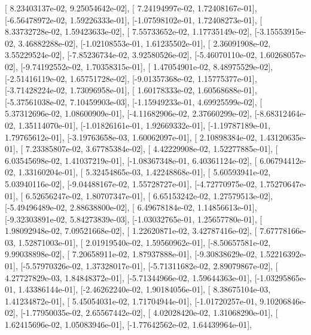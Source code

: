 \documentclass{article}
\begin{document}
       [ 8.23403137e-02,  9.25054642e-02],
       [ 7.24194997e-02,  1.72408167e-01],
       [-6.56478972e-02,  1.59226333e-01],
       [-1.07598102e-01,  1.72408273e-01],
       [ 8.33732728e-02,  1.59423633e-02],
       [ 7.55733652e-02,  1.17735149e-02],
       [-3.15553915e-02,  3.46882288e-02],
       [-1.02108553e-01,  1.61235502e-01],
       [ 2.36091908e-02,  3.55229524e-02],
       [-7.85236734e-02,  3.92580526e-02],
       [-5.46070110e-02,  1.60268057e-02],
       [-9.74192552e-02,  1.70358315e-01],
       [ 1.47054901e-02,  8.48975529e-02],
       [-2.51416119e-02,  1.65751728e-02],
       [-9.01357368e-02,  1.15775377e-01],
       [-3.71428224e-02,  1.73096958e-01],
       [ 1.60178333e-02,  1.60568688e-01],
       [-5.37561038e-02,  7.10459903e-03],
       [-1.15949233e-01,  4.69925599e-02],
       [ 5.37312696e-02,  1.08600909e-01],
       [-4.11682906e-02,  2.37660299e-02],
       [-8.68312464e-02,  1.35114070e-01],
       [-1.01826161e-01,  1.92669332e-01],
       [-1.19787189e-01,  1.79765612e-01],
       [-3.19763658e-03,  1.60062097e-01],
       [ 2.10898384e-02,  1.43120635e-01],
       [ 7.23385807e-02,  3.67785384e-02],
       [ 4.42229908e-02,  1.52277885e-01],
       [ 6.03545698e-02,  1.41037219e-01],
       [-1.08367348e-01,  6.40361124e-02],
       [ 6.06794412e-02,  1.33160204e-01],
       [ 5.32454865e-03,  1.42248868e-01],
       [ 5.60593941e-02,  5.03940116e-02],
       [-9.04488167e-02,  1.55728727e-01],
       [-4.72770975e-02,  1.75270647e-01],
       [ 6.52656247e-02,  1.80707347e-01],
       [ 6.65153242e-02,  1.27579513e-02],
       [-5.49496489e-02,  2.88638800e-02],
       [ 6.49678184e-02,  1.14856613e-01],
       [-9.32303891e-02,  5.84273839e-03],
       [-1.03032765e-01,  1.25657780e-01],
       [ 1.98092948e-02,  7.09521668e-02],
       [ 1.22620871e-02,  3.42787416e-02],
       [ 7.67778166e-03,  1.52871003e-01],
       [ 2.01919540e-02,  1.59560962e-01],
       [-8.50657581e-02,  9.99038898e-02],
       [ 7.20658911e-02,  1.87937888e-01],
       [-9.30838629e-02,  1.52216392e-01],
       [-5.57970326e-02,  1.37328017e-01],
       [-5.71311682e-02,  2.89079867e-02],
       [ 4.27727829e-03,  1.84848372e-01],
       [-5.71344966e-02,  1.59644363e-01],
       [-1.03295865e-01,  1.43386144e-01],
       [-2.46262240e-02,  1.90184056e-01],
       [ 8.38675104e-03,  1.41234872e-01],
       [ 5.45054031e-02,  1.71704944e-01],
       [-1.01720257e-01,  9.10206846e-02],
       [-1.77950035e-02,  2.65567442e-02],
       [ 4.02028420e-02,  1.31068290e-01],
       [ 1.62415696e-02,  1.05083946e-01],
       [-1.77642562e-02,  1.64439964e-01],
\end{document}
